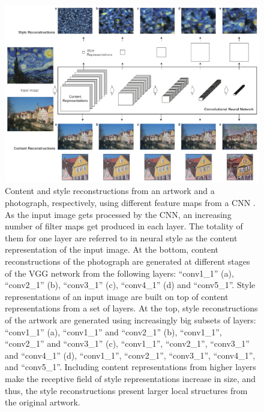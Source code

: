 \begin{figure}[t]
  \includegraphics[width=\textwidth]{gfx/neural-style-cnn}
  \caption{
    Content and style reconstructions from an artwork and a photograph, respectively, using different feature maps from a CNN \cite{Gatys2015B}.
    As the input image gets processed by the CNN, an increasing number of filter maps get produced in each layer.
    The totality of them for one layer are referred to in neural style as the content representation of the input image.
    At the bottom, content reconstructions of the photograph are generated at different stages of the VGG network from the following layers: ``conv1\_1'' (a), ``conv2\_1'' (b), ``conv3\_1'' (c), ``conv4\_1'' (d) and ``conv5\_1''.
    Style representations of an input image are built on top of content representations from a set of layers.
    At the top, style reconstructions of the artwork are generated using increasingly big subsets of layers: ``conv1\_1'' (a), ``conv1\_1'' and ``conv2\_1'' (b), ``conv1\_1'', ``conv2\_1'' and ``conv3\_1'' (c), ``conv1\_1'', ``conv2\_1'', ``conv3\_1'' and ``conv4\_1'' (d), ``conv1\_1'', ``conv2\_1'', ``conv3\_1'', ``conv4\_1'', and ``conv5\_1''.
    Including content representations from higher layers make the receptive field of style representations increase in size, and thus, the style reconstructions present larger local structures from the original artwork.
  }
  \label{sub:system:method:reconstructions}
\end{figure}

